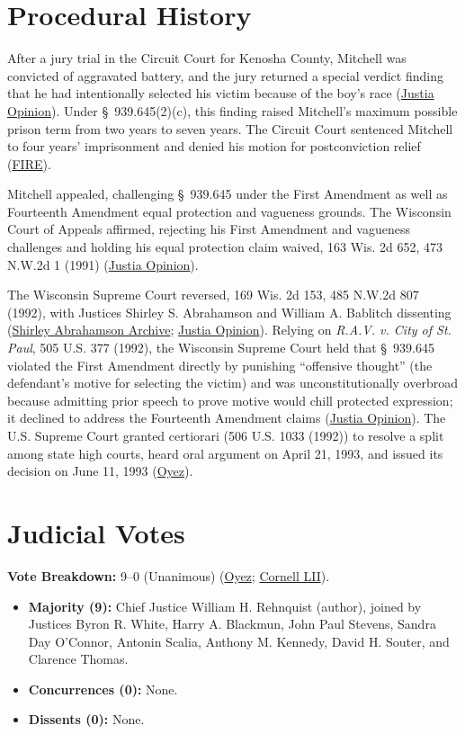 \documentclass[12pt]{article}
\begin{document}
\section{Procedural History}
After a jury trial in the Circuit Court for Kenosha County, Mitchell was convicted of aggravated battery, and the jury returned a special verdict finding that he had intentionally selected his victim because of the boy's race (\href{https://supreme.justia.com/cases/federal/us/508/476/}{Justia Opinion}). Under \S~939.645(2)(c), this finding raised Mitchell's maximum possible prison term from two years to seven years. The Circuit Court sentenced Mitchell to four years' imprisonment and denied his motion for postconviction relief (\href{https://www.fire.org/supreme-court/wisconsin-v-todd-mitchell}{FIRE}).

Mitchell appealed, challenging \S~939.645 under the First Amendment as well as Fourteenth Amendment equal protection and vagueness grounds. The Wisconsin Court of Appeals affirmed, rejecting his First Amendment and vagueness challenges and holding his equal protection claim waived, 163 Wis. 2d 652, 473 N.W.2d 1 (1991) (\href{https://supreme.justia.com/cases/federal/us/508/476/}{Justia Opinion}).

The Wisconsin Supreme Court reversed, 169 Wis. 2d 153, 485 N.W.2d 807 (1992), with Justices Shirley S. Abrahamson and William A. Bablitch dissenting (\href{https://www.shirleyabrahamson.org/criminal-law/}{Shirley Abrahamson Archive}; \href{https://supreme.justia.com/cases/federal/us/508/476/}{Justia Opinion}). Relying on \textit{R.A.V. v. City of St. Paul}, 505 U.S. 377 (1992), the Wisconsin Supreme Court held that \S~939.645 violated the First Amendment directly by punishing ``offensive thought'' (the defendant's motive for selecting the victim) and was unconstitutionally overbroad because admitting prior speech to prove motive would chill protected expression; it declined to address the Fourteenth Amendment claims (\href{https://supreme.justia.com/cases/federal/us/508/476/}{Justia Opinion}). The U.S. Supreme Court granted certiorari (506 U.S. 1033 (1992)) to resolve a split among state high courts, heard oral argument on April 21, 1993, and issued its decision on June 11, 1993 (\href{https://www.oyez.org/cases/1992/92-515}{Oyez}).

\section{Judicial Votes}
\textbf{Vote Breakdown:} 9--0 (Unanimous) (\href{https://www.oyez.org/cases/1992/92-515}{Oyez}; \href{https://www.law.cornell.edu/supct/html/92-515.ZS.html}{Cornell LII}).
\begin{itemize}
    \item \textbf{Majority (9):} Chief Justice William H. Rehnquist (author), joined by Justices Byron R. White, Harry A. Blackmun, John Paul Stevens, Sandra Day O'Connor, Antonin Scalia, Anthony M. Kennedy, David H. Souter, and Clarence Thomas.
    \item \textbf{Concurrences (0):} None.
    \item \textbf{Dissents (0):} None.
\end{itemize}
\end{document}
